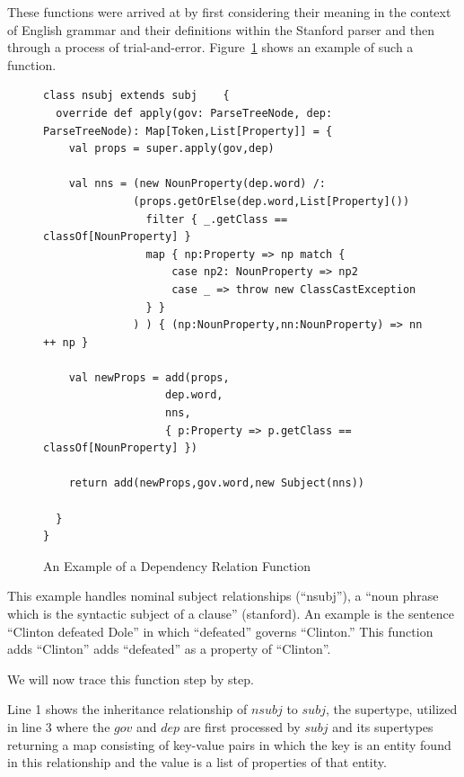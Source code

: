 
These functions were arrived at by first considering their meaning in the context of English grammar and their definitions within the Stanford parser and then through a process of trial-and-error.  Figure~\ref{ref:dep-func} shows an example of such a function.

\begin{figure}
\begin{lstlisting}[style=scalastyle]
class nsubj extends subj	{
  override def apply(gov: ParseTreeNode, dep: ParseTreeNode): Map[Token,List[Property]] = {
    val props = super.apply(gov,dep)

    val nns = (new NounProperty(dep.word) /: 
              (props.getOrElse(dep.word,List[Property]()) 
                filter { _.getClass == classOf[NounProperty] } 
                map { np:Property => np match { 
                    case np2: NounProperty => np2 
                    case _ => throw new ClassCastException 
                } } 
              ) ) { (np:NounProperty,nn:NounProperty) => nn ++ np }

    val newProps = add(props,
                   dep.word,
                   nns,
                   { p:Property => p.getClass == classOf[NounProperty] })
                   
    return add(newProps,gov.word,new Subject(nns))

  }
}
\end{lstlisting}
\caption{An Example of a Dependency Relation Function}
\label{ref:dep-func}
\end{figure}

This example handles nominal subject relationships (``nsubj''), a ``noun phrase which is the syntactic subject of a clause'' (stanford).  An example is the sentence ``Clinton defeated Dole'' in which ``defeated'' governs ``Clinton.''  This function adds ``Clinton'' adds ``defeated'' as a property of ``Clinton''.  

We will now trace this function step by step.

Line 1 shows the inheritance relationship of $nsubj$ to $subj$, the supertype, utilized in line 3 where the $gov$ and $dep$ are first processed by $subj$ and its supertypes returning a map consisting of key-value pairs in which the key is an entity found in this relationship and the value is a list of properties of that entity.  

